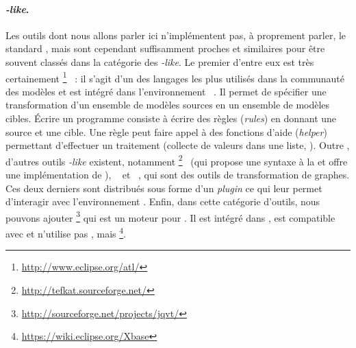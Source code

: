 \paragraph{\emph{{\qvt}-like}.}
Les outils dont nous allons parler ici n'implémentent pas, à proprement parler,
le standard {\qvt}, mais sont cependant suffisamment proches et similaires pour
être souvent classés dans la catégorie des \emph{{\qvt}-like}. Le premier
d'entre eux est très certainement
{\atl}\footnote{\url{http://www.eclipse.org/atl/}}~\cite{Bezivin2003-firstExperiment,Bezivin2005,Jouault2006,JouaultABK08}
: il s'agit d'un des langages les plus utilisés dans la communauté des
modèles et est intégré dans l'environnement {\eclipse}~\cite{atl04}. Il permet
de spécifier une transformation d'un ensemble de modèles sources en un ensemble
de modèles cibles. Écrire un programme {\atl} consiste à écrire des règles
(\emph{rules}) en donnant une source et une cible. Une règle peut faire appel à
des fonctions d'aide (\emph{helper}) permettant d'effectuer un traitement
(collecte de valeurs dans une liste, \etc).
Outre {\atl}, d'autres outils \emph{{\qvt}-like} existent, notamment
{\tefkat}\footnote{\url{http://tefkat.sourceforge.net/}}~\cite{Lawley2006} (qui
propose une syntaxe à la {\sql} et offre une implémentation de {\qvtr}),
{\great}~\cite{Agrawal2003,Balasubramanian2007} et {\viatra}~\cite{Varro2007},
qui sont des outils de transformation de graphes. Ces deux derniers sont
distribués sous forme d'un \emph{plugin} {\eclipse} ce qui leur permet
d'interagir avec l'environnement {\emf}.  Enfin, dans cette catégorie d'outils,
nous pouvons ajouter
{\jqvt}\footnote{\url{http://sourceforge.net/projects/jqvt/}} qui est un moteur
{\qvt} pour {\java}. Il est intégré dans {\eclipse}, est compatible avec {\emf}
et n'utilise pas {\ocl}, mais
{\xbase}\footnote{\url{https://wiki.eclipse.org/Xbase}}.


